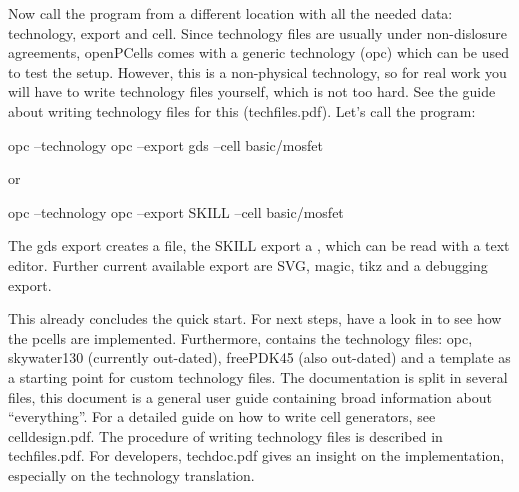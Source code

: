 Now call the program from a different location with all the needed data: technology, export and cell.
Since technology files are usually under non-dislosure agreements, openPCells comes with a generic technology (opc) which can be used to test the setup.
However, this is a non-physical technology, so for real work you will have to write technology files yourself, which is not too hard.
See the guide about writing technology files for this (techfiles.pdf).
Let's call the program:
\begin{shellcode}
    opc --technology opc --export gds --cell basic/mosfet
\end{shellcode}
or
\begin{shellcode}
    opc --technology opc --export SKILL --cell basic/mosfet
\end{shellcode}
The gds export creates a  file, the SKILL export a , which can be read with a text editor.
Further current available export are SVG, magic, tikz and a debugging export.

This already concludes the quick start.
For next steps, have a look in  to see how the pcells are implemented.
Furthermore,  contains the technology files: opc, skywater130 (currently out-dated), freePDK45 (also out-dated) and a template as a starting point for custom technology files.
The documentation is split in several files, this document is a general user guide containing broad information about \enquote{everything}.
For a detailed guide on how to write cell generators, see celldesign.pdf.
The procedure of writing technology files is described in techfiles.pdf.
For developers, techdoc.pdf gives an insight on the implementation, especially on the technology translation.

